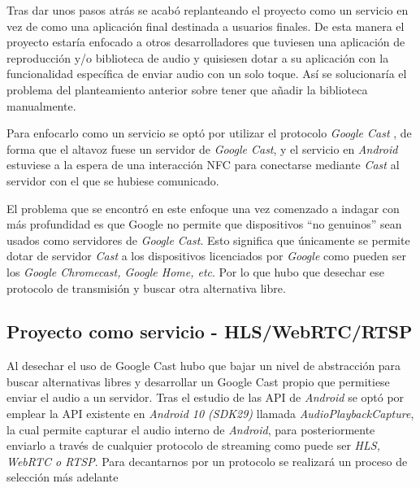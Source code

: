 Tras dar unos pasos atrás se acabó replanteando el proyecto como un servicio en
vez de como una aplicación final destinada a usuarios finales. De esta manera el
proyecto estaría enfocado a otros desarrolladores que tuviesen una aplicación de
reproducción y/o biblioteca de audio y quisiesen dotar a su aplicación con la
funcionalidad específica de enviar audio con un solo toque. Así se
solucionaría el problema del planteamiento anterior sobre tener que añadir la
biblioteca manualmente.

Para enfocarlo como un servicio se optó por utilizar el protocolo \emph{Google
Cast} \cite{google-cast}, de forma que el altavoz fuese
un servidor de \emph{Google Cast}, y el servicio en \emph{Android} estuviese a
la espera de una interacción NFC para conectarse mediante \emph{Cast} al
servidor con el que se hubiese comunicado. 

El problema que se encontró en este enfoque una vez comenzado a indagar con más
profundidad es que Google no permite que dispositivos ``no genuinos'' sean
usados como servidores de \emph{Google Cast}. Esto significa que únicamente se
permite dotar de servidor \emph{Cast} a los dispositivos licenciados por
\emph{Google} como pueden ser los \emph{Google Chromecast, Google Home, etc}.
Por lo que hubo que desechar ese protocolo de transmisión y buscar otra
alternativa libre.

\subsection{Proyecto como servicio - HLS/WebRTC/RTSP}

Al desechar el uso de Google Cast hubo que bajar un nivel de abstracción para
buscar alternativas libres y desarrollar un Google Cast propio que permitiese
enviar el audio a un servidor. Tras el estudio de las API de \emph{Android} se
optó por emplear la API existente en \emph{Android 10 (SDK29)} llamada
\emph{AudioPlaybackCapture}, la cual permite capturar el audio interno de
\emph{Android}, para posteriormente enviarlo a través de cualquier protocolo de
streaming como puede ser \emph{HLS, WebRTC o RTSP}. Para decantarnos por un
protocolo se realizará un proceso de selección más adelante